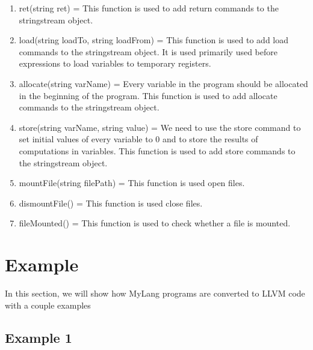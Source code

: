 \documentclass[12pt,a4paper]{article}
\begin{document}
\begin{enumerate}
    \item ret(string ret) = This function is used to add return commands to the stringstream object.
    \item load(string loadTo, string loadFrom) = This function is used to add load commands to the stringstream object. It is used primarily used before expressions to load variables to temporary registers.
    \item allocate(string varName) = Every variable in the program should be allocated in the beginning of the program. This function is used to add allocate commands to the stringstream object. 
    \item store(string varName, string value) = We need to use the store command to set initial values of every variable to 0 and to store the results of computations in variables. This function is used to add store commands to the stringstream object. 
    \item mountFile(string filePath) = This function is used open files.
    \item dismountFile() = This function is used close files.
    \item fileMounted() = This function is used to check whether a file is mounted.
\end{enumerate}

\section{Example}
In this section, we will show how MyLang programs are converted to LLVM code with a couple examples

\subsection{Example 1}

\end{document}
